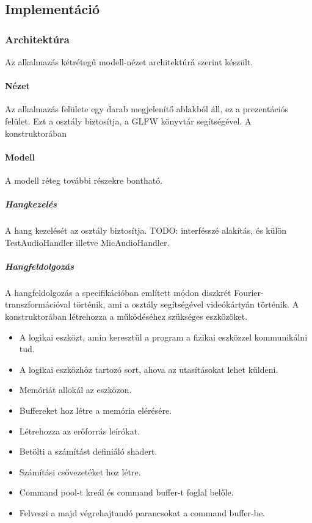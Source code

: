 
\subsection{Implement\'aci\'o}

\subsubsection{Architekt\'ura}
Az alkalmaz\'as k\'etr\'eteg\H u modell-n\'ezet architekt\'ur\'a szerint k\'esz\"ult.

\paragraph{N\'ezet}
Az alkalmaz\'as fel\"ulete egy darab megjelen\'it\H o ablakb\'ol \'all, ez a prezent\'aci\'os fel\"ulet.
Ezt a  oszt\'aly biztos\'itja, a GLFW k\"onyvt\'ar seg\'its\'eg\'evel.
A konstruktor\'aban %

\paragraph{Modell}
A modell r\'eteg tov\'abbi r\'eszekre bonthat\'o.

\subparagraph{Hangkezel\'es}
A hang kezel\'es\'et az  oszt\'aly biztos\'itja.
TODO: interf\'essz\'e alak\'it\'as, \'es k\"ul\"on TestAudioHandler illetve MicAudioHandler.

\subparagraph{Hangfeldolgoz\'as}
A hangfeldolgoz\'as a specifik\'aci\'oban eml\'itett m\'odon diszkr\'et Fourier-transzform\'aci\'oval t\"ort\'enik, ami a  oszt\'aly seg\'its\'eg\'evel vide\'ok\'arty\'an t\"ort\'enik.
A konstruktor\'aban l\'etrehozza a m\H uk\"od\'es\'ehez sz\"uks\'eges eszk\"oz\"oket. 
\begin{itemize}
	\item A logikai eszk\"ozt, amin kereszt\"ul a program a fizikai eszk\"ozzel kommunik\'alni tud.
	\item A logikai eszk\"ozh\"oz tartoz\'o sort, ahova az utas\'it\'asokat lehet k\"uldeni.
	\item Mem\'ori\'at allok\'al az eszk\"ozon.
	\item Buffereket hoz l\'etre a mem\'oria el\'er\'es\'ere.
	\item L\'etrehozza az er\H oforr\'as le\'ir\'okat.
	\item Bet\"olti a sz\'am\'it\'ast defini\'al\'o shadert.
	\item Sz\'am\'it\'asi cs\H ovezet\'eket hoz l\'etre.
	\item Command pool-t kre\'al \'es command buffer-t foglal bel\H ole.
	\item Felveszi a majd v\'egrehajtand\'o parancsokat a command buffer-be.
\end{itemize}

